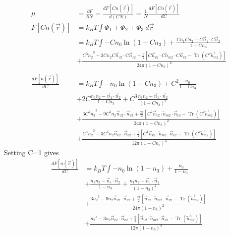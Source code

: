 \documentclass[double,12pt]{revtex4-2}
\begin{document}
\begin{align}
  \mu &= \frac{\partial F}{\partial N} = \frac{dF[Cn(\vec r)]}{d(CN)} = \frac{1}{N}\frac{dF[Cn(\vec r)]}{dC}\\
   F[Cn(\vec r)] &= k_BT\int \Phi_1 +\Phi_2+\Phi_3 ~d\vec r \\
   &= k_BT\int -Cn_0\ln\left(1-Cn_3\right) + \frac{Cn_1Cn_2-C\vec n_1\cdot C\vec n_2}{1-Cn_3} \\
   &+ \frac{{C^3n_2}^3-3Cn_2C\vec n_{v2}\cdot C\vec n_{v2}+\frac{9}{2}
       [C\vec n_{v2}\cdot{C\overleftrightarrow{n}_{m2}}\cdot{C\vec n_{v2}}
       -\operatorname{Tr}({C^3\overleftrightarrow n^3_{m2}})]}{24\pi(1-Cn_3)^2}    \\ \\
%   
  \frac{dF[n(\vec r)]}{dC}    &= k_BT\int -n_0\ln\left(1-Cn_3\right) + C^2\frac{n_0}{1-Cn_3} \\
   &+ 2C\frac{n_1n_2-\vec n_1\cdot\vec n_2}{1-Cn_3} +C^3 \frac{n_1n_2-\vec n_1\cdot\vec n_2}{(1-Cn_3)^2} \\   
   &+ \frac{{3C^2n_2}^3-9C^2n_2\vec n_{v2}\cdot \vec n_{v2} 
   + \frac{27}{2}[C^2\vec n_{v2}\cdot{\overleftrightarrow{n}_{m2}}\cdot{\vec n_{v2}} 
       -\operatorname{Tr}({C^2\overleftrightarrow n^3_{m2}})]}{24\pi(1-Cn_3)^2}   \\ 
    &+ \frac{{C^4n_2}^3-3C^4n_2\vec n_{v2}\cdot \vec n_{v2} 
    + \frac{9}{2}[C^4\vec n_{v2}\cdot{\overleftrightarrow{n}_{m2}}\cdot{\vec n_{v2}}   
       -\operatorname{Tr}({C^4\overleftrightarrow n^3_{m2}})]}{12\pi(1-Cn_3)^3}     
\end{align} 
Setting C=1 gives
\begin{align}
   \frac{dF[n(\vec r)]}{dC} &= k_BT\int -n_0\ln\left(1-n_3\right) + \frac{n_0}{1-n_3} \\
   &+ \frac{n_1n_2-\vec n_1\cdot\vec n_2}{1-n_3} + \frac{n_1n_2-\vec n_1\cdot\vec n_2}{(1-n_3)^2} \\   
   &+ \frac{{3n_2}^3-9n_2\vec n_{v2}\cdot \vec n_{v2} 
   + \frac{27}{2}[\vec n_{v2}\cdot{\overleftrightarrow{n}_{m2}}\cdot{\vec n_{v2}} 
       -\operatorname{Tr}({\overleftrightarrow n^3_{m2}})]}{24\pi(1-n_3)^2}   \\ 
    &+ \frac{{n_2}^3-3n_2\vec n_{v2}\cdot \vec n_{v2} 
    + \frac{9}{2}[\vec n_{v2}\cdot{\overleftrightarrow{n}_{m2}}\cdot{\vec n_{v2}}   
       -\operatorname{Tr}({\overleftrightarrow n^3_{m2}})]}{12\pi(1-n_3)^3}     
\end{align} 
\end{document}
